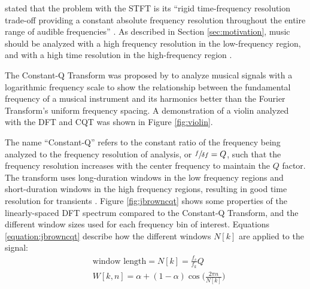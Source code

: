 \documentclass[report.tex]{subfiles}
\begin{document}
\citeauthor{cqtransient} stated that the problem with the STFT is its ``rigid time-frequency resolution trade-off providing a constant absolute frequency resolution throughout the entire range of audible frequencies'' \parencite[1]{cqtransient}. As described in Section \ref{sec:motivation}, music should be analyzed with a high frequency resolution in the low-frequency region, and with a high time resolution in the high-frequency region \parencite{doerflerphd, cqtransient}. 

The Constant-Q Transform was proposed by \textcite{jbrown, msp} to analyze musical signals with a logarithmic frequency scale to show the relationship between the fundamental frequency of a musical instrument and its harmonics better than the Fourier Transform's uniform frequency spacing. A demonstration of a violin analyzed with the DFT and CQT was shown in Figure \ref{fig:violin}.

The name ``Constant-Q'' refers to the constant ratio of the frequency being analyzed to the frequency resolution of analysis, or $\sfrac{f}{\delta f} = Q$, such that the frequency resolution increases with the center frequency to maintain the $Q$ factor. The transform uses long-duration windows in the low frequency regions and short-duration windows in the high frequency regions, resulting in good time resolution for transients \parencite{cqtransient}. Figure \ref{fig:jbrowncqt} shows some properties of the linearly-spaced DFT spectrum compared to the Constant-Q Transform, and the different window sizes used for each frequency bin of interest. Equations \eqref{equation:jbrowncqt} describe how the different windows $N[k]$ are applied to the signal:
\begin{align}\tag{9}\label{equation:jbrowncqt}
	\nonumber & \text{window length} = N[k] = \frac{f_{s}}{f_{k}}Q\\
	\nonumber & W[k, n] = \alpha + (1 - \alpha)\cos\big(\frac{2\pi n}{N[k]}\big)
\end{align}
\end{document}
